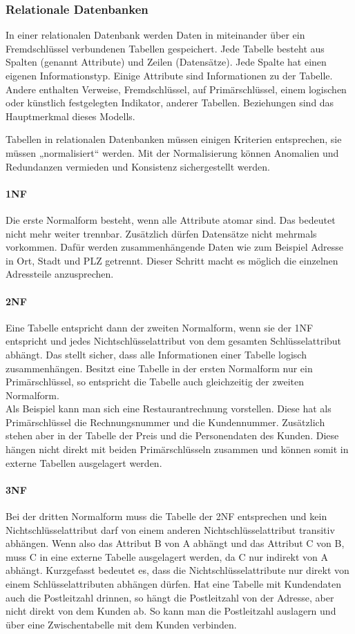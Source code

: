 \subsubsection{Relationale Datenbanken}
In einer relationalen Datenbank werden Daten in miteinander über ein Fremdschlüssel verbundenen Tabellen gespeichert. Jede Tabelle besteht aus Spalten (genannt Attribute) und Zeilen (Datensätze). Jede Spalte hat einen eigenen Informationstyp.  Einige Attribute sind Informationen zu der Tabelle. Andere enthalten Verweise, Fremdschlüssel, auf Primärschlüssel, einem logischen oder künstlich festgelegten Indikator, anderer Tabellen. Beziehungen sind das Hauptmerkmal dieses Modells. 

Tabellen in relationalen Datenbanken müssen einigen Kriterien entsprechen, sie müssen „normalisiert“ werden. Mit der Normalisierung können Anomalien und Redundanzen vermieden und Konsistenz sichergestellt werden.


\paragraph{1NF}
Die erste Normalform besteht, wenn alle Attribute atomar sind. Das bedeutet nicht mehr weiter trennbar. Zusätzlich dürfen Datensätze nicht mehrmals vorkommen. Dafür werden zusammenhängende Daten wie zum Beispiel Adresse in Ort, Stadt und PLZ getrennt. Dieser Schritt macht es möglich die einzelnen Adressteile anzusprechen.
\paragraph{2NF}
Eine Tabelle entspricht dann der zweiten Normalform, wenn sie der 1NF entspricht und jedes Nichtschlüsselattribut von dem gesamten Schlüsselattribut abhängt. Das stellt sicher, dass alle Informationen einer Tabelle logisch zusammenhängen. Besitzt eine Tabelle in der ersten Normalform nur ein Primärschlüssel, so entspricht die Tabelle auch gleichzeitig der zweiten Normalform.\\  Als Beispiel kann man sich eine Restaurantrechnung vorstellen. Diese hat als Primärschlüssel die Rechnungsnummer und die Kundennummer. Zusätzlich stehen aber in der Tabelle der Preis und die Personendaten des Kunden. Diese hängen nicht direkt mit beiden Primärschlüsseln zusammen und können somit in externe Tabellen ausgelagert werden.
\paragraph{3NF}
Bei der dritten Normalform muss die Tabelle der 2NF entsprechen und kein Nichtschlüsselattribut darf von einem anderen Nichtschlüsselattribut transitiv abhängen. Wenn also das Attribut B von A abhängt und das Attribut C von B, muss C in eine externe Tabelle ausgelagert werden, da C nur indirekt von A abhängt. Kurzgefasst bedeutet es, dass die Nichtschlüsselattribute nur direkt von einem Schlüsselattributen abhängen dürfen. Hat eine Tabelle mit Kundendaten auch die Postleitzahl drinnen, so hängt die Postleitzahl von der Adresse, aber nicht direkt von dem Kunden ab. So kann man die Postleitzahl auslagern und über eine Zwischentabelle mit dem Kunden verbinden.


